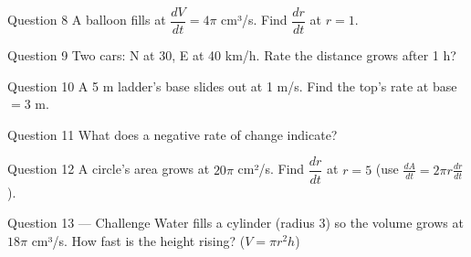 \documentclass[11pt]{article}
\begin{document}
\begin{qbox}{Question 8}
A balloon fills at $\dfrac{dV}{dt}=4\pi$ cm³/s. Find $\dfrac{dr}{dt}$ at $r=1$.\workspace{2.4cm}
\end{qbox}

\begin{qbox}{Question 9}
Two cars: N at 30, E at 40 km/h. Rate the distance grows after 1 h?\workspace{2.4cm}
\end{qbox}

\begin{qbox}{Question 10}
A 5 m ladder's base slides out at 1 m/s. Find the top's rate at base $=3$ m.\workspace{2.4cm}
\end{qbox}

\begin{qbox}{Question 11}
What does a negative rate of change indicate?\workspace{2.4cm}
\end{qbox}

\begin{qbox}{Question 12}
A circle's area grows at $20\pi$ cm²/s. Find $\dfrac{dr}{dt}$ at $r=5$ (use $\tfrac{dA}{dt}=2\pi r\tfrac{dr}{dt}$).\workspace{2.4cm}
\end{qbox}

\begin{qbox}{Question 13 --- Challenge}
Water fills a cylinder (radius 3) so the volume grows at $18\pi$ cm³/s. How fast is the height rising? ($V=\pi r^2 h$)\workspace{3cm}
\end{qbox}

\clearpage
{}
\end{document}
